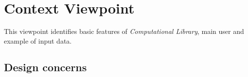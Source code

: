 \chapter{Context Viewpoint} \label{chp:context-viewpoint-template}

	This viewpoint identifies basic features of \emph{Computational Library}, main user and example of input data.
	\section{Design concerns} \label{s:context-viewpoint-template:design-concerns}

		
